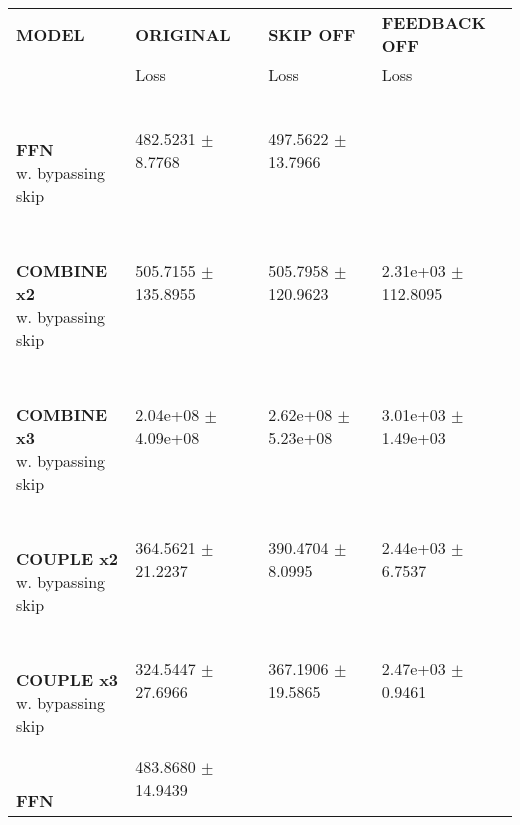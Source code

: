
\begin{table}[ht]
    \centering
    \begin{tabular}{|>{\columncolor{gray!05}}l|l|l|l|}
        \hline
        \rowcolor{white}
        \textbf{\footnotesize MODEL} & \textbf{\footnotesize ORIGINAL} & \textbf{\footnotesize SKIP OFF} & \textbf{\footnotesize FEEDBACK OFF} \\

        \rowcolor{white}
        & {\footnotesize Loss} & {\footnotesize Loss} & {\footnotesize Loss} \\
        \hline
\shortstack[l]{\\ {} \\ \textbf{\footnotesize FFN}\\{\footnotesize w. bypassing skip}} & {\footnotesize 482.5231 $\pm$ 8.7768} & {\footnotesize 497.5622 $\pm$ 13.7966} &  \\
 \hline 
\shortstack[l]{\\ {} \\ \textbf{\footnotesize COMBINE x2}\\{\footnotesize w. bypassing skip}} & {\footnotesize 505.7155 $\pm$ 135.8955} & {\footnotesize 505.7958 $\pm$ 120.9623} & {\footnotesize 2.31e+03 $\pm$ 112.8095} \\
 \hline 
\shortstack[l]{\\ {} \\ \textbf{\footnotesize COMBINE x3}\\{\footnotesize w. bypassing skip}} & {\footnotesize 2.04e+08 $\pm$ 4.09e+08} & {\footnotesize 2.62e+08 $\pm$ 5.23e+08} & {\footnotesize 3.01e+03 $\pm$ 1.49e+03} \\
 \hline 
\shortstack[l]{\\ {} \\ \textbf{\footnotesize COUPLE x2}\\{\footnotesize w. bypassing skip}} & {\footnotesize 364.5621 $\pm$ 21.2237} & {\footnotesize 390.4704 $\pm$ 8.0995} & {\footnotesize 2.44e+03 $\pm$ 6.7537} \\
 \hline 
\shortstack[l]{\\ {} \\ \textbf{\footnotesize COUPLE x3}\\{\footnotesize w. bypassing skip}} & {\footnotesize 324.5447 $\pm$ 27.6966} & {\footnotesize 367.1906 $\pm$ 19.5865} & {\footnotesize 2.47e+03 $\pm$ 0.9461} \\
 \hline 
\shortstack[l]{\\ {} \\ \textbf{\footnotesize FFN}\\{\footnotesize }} & {\footnotesize 483.8680 $\pm$ 14.9439} &  &  \\

\end{tabular}
\end{table}
